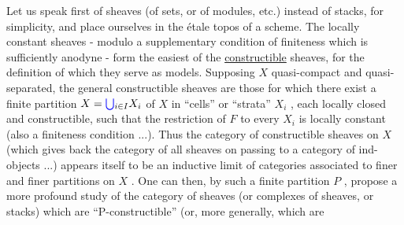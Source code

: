 \documentclass[11pt]{article}
\newcommand{\scanpage}[1]{\par\bigskip\noindent{\small\sffamily[scan #1]}\par}
\newcommand{\mspage}[1]{{\small\sffamily[p.\,#1]}}
\newcommand{\hand}[1]{\textcolor{blue}{#1}}
\newcommand{\uline}[1]{\underline{#1}}
\begin{document}
Let us speak first of sheaves (of sets, or of modules, etc.)
instead of stacks, for simplicity, and place ourselves in the
étale topos of a scheme. The locally constant sheaves - modulo
a supplementary condition of finiteness which is sufficiently
anodyne - form the easiest of the \uline{constructible} sheaves, for
the definition of which they serve as models. Supposing $X$
quasi-compact and quasi-separated, the general constructible
sheaves are those for which there exist a finite partition
$X = \hand{\bigcup}_{i\in I} X_i$ of $X$ in ``cells'' or ``strata'' $X_i$ , each locally
closed and constructible, such that the restriction of $F$ to
every $X_i$ is locally constant (also a finiteness condition ...).
Thus the category of constructible sheaves on $X$ (which gives
back the category of all sheaves on passing to a category of
ind-objects ...) appears itself to be an inductive limit of
categories associated to finer and finer partitions on $X$ . One
can then, by such a finite partition $P$ , propose a more profound
study of the category of sheaves (or complexes of sheaves, or
stacks) which are ``P-constructible'' (or, more generally, which are

\mspage{\hand{135}}

\clearpage
\scanpage{134-2/135}
\mspage{- 8 -}
\end{document}
